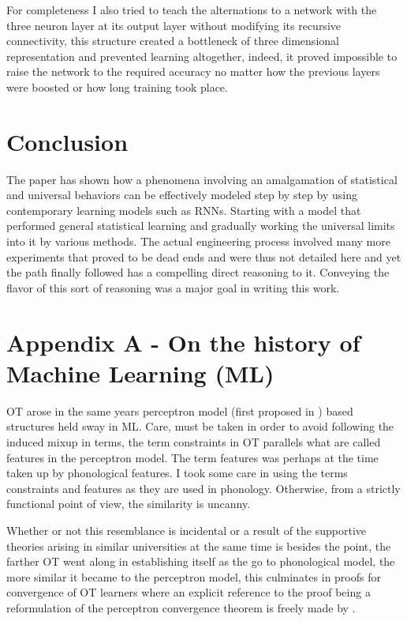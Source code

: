 \documentclass[a4paper,12pt]{article}
\begin{document}
For completeness I also tried to teach the alternations to a network with the three neuron layer at
its output layer without modifying its recursive connectivity, this structure created a bottleneck
of three dimensional representation and prevented learning altogether, indeed, it proved impossible
to raise the network to the required accuracy no matter how the previous layers were boosted or how
long training took place.

\section{Conclusion}

The paper has shown how a phenomena involving an amalgamation of statistical and universal behaviors
can be effectively modeled step by step by using contemporary learning models such as RNNs. Starting with
a model that performed general statistical learning and gradually working the universal limits
into it by various methods. The actual engineering process involved many more experiments that
proved to be dead ends and were thus not detailed here and yet the path finally followed has a
compelling direct reasoning to it. Conveying the flavor of this sort of reasoning was a major goal
in writing this work.

\pagebreak

\appendix

\section{Appendix A - On the history of Machine Learning (ML)}

OT arose in the same years perceptron model (first proposed in \cite{rosenblatt_perceptron_1958}) based
structures held sway in ML. Care, must be taken in order to avoid following the induced mixup in
terms, the term constraints in OT parallels what are called features in the perceptron model. The
term features was perhaps at the time taken up by phonological features. I took some care in using
the terms constraints and features as they are used in phonology. Otherwise, from a strictly
functional point of view, the similarity is uncanny.

Whether or not this resemblance is incidental or a result of the supportive theories arising in
similar universities at the same time is besides the point, the farther OT went along in
establishing itself as the go to phonological model, the more similar it became to the perceptron
model, this culminates in proofs for convergence of OT learners where an explicit reference to the
proof being a reformulation of the perceptron convergence theorem is freely made by
\cite{boersma_convergence_2008}.
\end{document}
